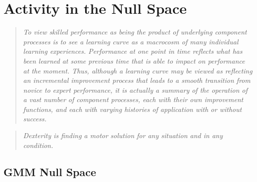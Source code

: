 \documentclass[../main.tex]{subfiles}
\begin{document}
\chapter{Activity in the Null Space}\label{chap:nullspace}

\begin{quote}
  \emph{To view skilled performance as being the product of underlying component processes is to see a learning curve as a macrocosm of many individual learning experiences. Performance at one point in time reflects what has been learned at some previous time that is able to impact on performance at the moment. Thus, although a learning curve may be viewed as reflecting an incremental improvement process that leads to a smooth transition from novice to expert performance, it is actually a summary of the operation of a vast number of component processes, each with their own improvement functions, and each with varying histories of application with or without success.}\\
\end{quote}

\begin{quote}
  \emph{Dexterity is finding a motor solution for any situation and in any condition.}\\
\end{quote}


\cleardoublepage%

\section{GMM Null Space}
\end{document}
